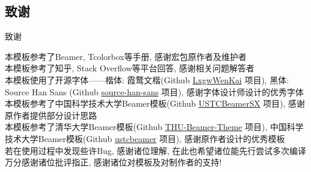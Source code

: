 \documentclass[hyperref, UTF8, CJK, aspectratio=169]{beamer}
\begin{document}
\subsection{致谢}
\begin{frame}{致谢}
	\begin{center}
		本模板参考了Beamer, Tcolorbox等手册, 感谢宏包原作者及维护者\\[1ex]
		本模板参考了知乎, Stack Overflow等平台回答, 感谢相关问题解答者\\[1ex]
		本模板使用了开源字体——楷体: 霞鹜文楷(Github \href{https://github.com/lxgw/LxgwWenKai/}{\color{scublue}LxgwWenKai} 项目), 黑体: Source Han Sans (Github \href{https://github.com/adobe-fonts/source-han-sans/}{\color{scublue}source-han-sans} 项目), 感谢字体设计师设计的优秀字体\\[1ex]
		本模板参考了中国科学技术大学Beamer模板(Github \href{https://github.com/ysx2000/USTCBeamerSX/}{\color{scublue}USTCBeamerSX} 项目), 感谢原作者提供部分设计思路\\[1ex]
		本模板参考了清华大学Beamer模板(Github \href{https://github.com/tuna/THU-Beamer-Theme/}{\color{scublue}THU-Beamer-Theme} 项目), 中国科学技术大学Beamer模板(Github \href{https://github.com/ustctug/ustcbeamer/}{\color{scublue}ustcbeamer} 项目), 感谢原作者设计的优秀模板\\[1ex]
		
		若在使用过程中发现些许Bug, 感谢诸位理解, 在此也希望诸位能先行尝试多次编译\\[1ex]
		万分感谢诸位批评指正, 感谢诸位对模板及对制作者的支持!
	\end{center}
\end{frame}


\appendix

\end{document}
